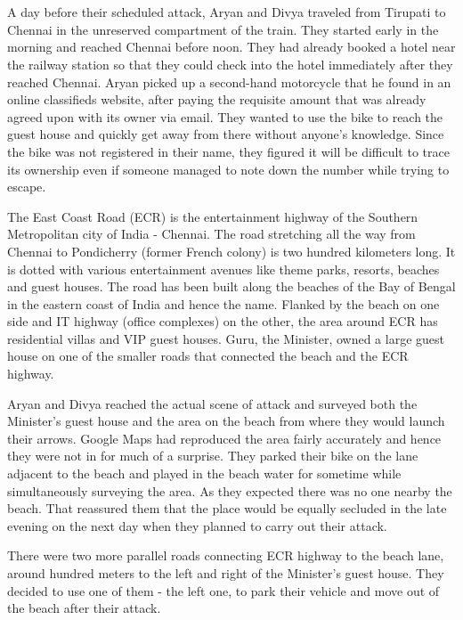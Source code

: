 \chapter{}

A day before their scheduled attack, Aryan and Divya traveled from Tirupati to
Chennai in the unreserved compartment of the train. They started early in the
morning and reached Chennai before noon. They had already booked a hotel near
the railway station so that they could check into the hotel immediately after
they reached Chennai. Aryan picked up a second-hand motorcycle that he found in
an online classifieds website, after paying the requisite amount that was
already agreed upon with its owner via email. They wanted to use the bike to
reach the guest house and quickly get away from there without anyone's
knowledge. Since the bike was not registered in their name, they figured it will
be difficult to trace its ownership even if someone managed to note down the
number while trying to escape.

The East Coast Road (ECR) is the entertainment highway of the Southern
Metropolitan city of India - Chennai. The road stretching all the way from
Chennai to Pondicherry (former French colony) is two hundred kilometers long. It
is dotted with various entertainment avenues like theme parks, resorts, beaches
and guest houses. The road has been built along the beaches of the Bay of Bengal
in the eastern coast of India and hence the name. Flanked by the beach on one
side and IT highway (office complexes) on the other, the area around ECR has
residential villas and VIP guest houses. Guru, the Minister, owned a large guest
house on one of the smaller roads that connected the beach and the ECR highway.

Aryan and Divya reached the actual scene of attack and surveyed both the
Minister's guest house and the area on the beach from where they would launch
their arrows. Google Maps had reproduced the area fairly accurately and hence
they were not in for much of a surprise. They parked their bike on the lane
adjacent to the beach and played in the beach water for sometime while
simultaneously surveying the area. As they expected there was no one nearby the
beach. That reassured them that the place would be equally secluded in the late
evening on the next day when they planned to carry out their attack.

There were two more parallel roads connecting ECR highway to the beach lane,
around hundred meters to the left and right of the Minister's guest house. They
decided to use one of them - the left one, to park their vehicle and move out of
the beach after their attack.

